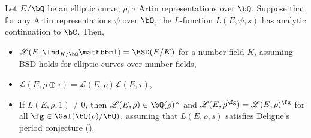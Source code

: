 \begin{thm} \cite[Corollary 25]{DEW1}
   Let $E / \bQ$ be an elliptic curve, $\rho$, $\tau$ Artin representations over $\bQ$. Suppose that for any Artin representations $\psi$ over $\bQ$, the $L$-function $L(E, \psi, s)$ has analytic continuation to $\bC$. Then,
   \begin{itemize}[(i)]
    \setlength\itemsep{0em}
    \item $\mathcal{L}(E, \Ind_{K / \bQ} \trivial) = \BSD(E / K)$ for a number field $K$, assuming BSD holds for elliptic curves over number fields,
    \item $\mathcal{L}(E, \rho \oplus \tau) = \mathcal{L}(E, \rho)\mathcal{L}(E, \tau)$,
    \item If $L(E, \rho, 1) \not= 0$, then $\mathcal{L}(E, \rho) \in \bQ(\rho)^{\times}$ and $\mathcal{L}(E, \rho^{\fg}) = \mathcal{L}(E, \rho)^{\fg}$ for all $\fg \in \Gal(\bQ(\rho) / \bQ)$, assuming that $L(E, \rho, s)$ satisfies Deligne's period conjecture (\cite{Deligne}).
   \end{itemize}
   
\end{thm}



